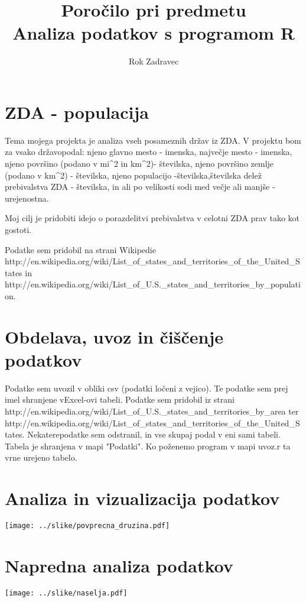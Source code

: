 \documentclass[11pt,a4paper]{article}
\begin{document}
\title{Poročilo pri predmetu \\
Analiza podatkov s programom R}
\author{Rok Zadravec}
\maketitle

\section{ZDA - populacija}

Tema mojega projekta je analiza vseh posameznih držav iz ZDA. V projektu bom za vsako državo\n podal: njeno glavno mesto - imenska, največje mesto - imenska, njeno površino (podano v mi^2 in km^2)\n - številska, njeno površino zemlje (podano v km^2) - številska, njeno populacijo -številska,\n številska delež prebivalstva ZDA  - številska, in ali po velikosti sodi med večje ali manjše\n
- urejenostna.

Moj cilj je pridobiti idejo o porazdelitvi prebivalstva v celotni ZDA prav tako kot gostoti.

Podatke sem pridobil na strani Wikipedie http://en.wikipedia.org/wiki/List_of_states_and_territories_of_the_United_States in 
http://en.wikipedia.org/wiki/List_of_U.S._states_and_territories_by_population.

\section{Obdelava, uvoz in čiščenje podatkov}

Podatke sem uvozil v obliki csv (podatki ločeni z vejico). Te podatke sem prej imel shranjene v\n Excel-ovi tabeli. Podatke sem\n 
pridobil iz strani http://en.wikipedia.org/wiki/List_of_U.S._states_and_territories_by_area ter\n 
http://en.wikipedia.org/wiki/List_of_states_and_territories_of_the_United_States. Nekatere\n podatke sem odstranil, in vse skupaj podal v eni sami tabeli. Tabela je shranjena v mapi "Podatki".\n
Ko poženemo program v mapi uvoz.r ta vrne urejeno tabelo.\n

\section{Analiza in vizualizacija podatkov}

\texttt{[image: ../slike/povprecna\_druzina.pdf]}

\section{Napredna analiza podatkov}

\texttt{[image: ../slike/naselja.pdf]}
\end{document}
